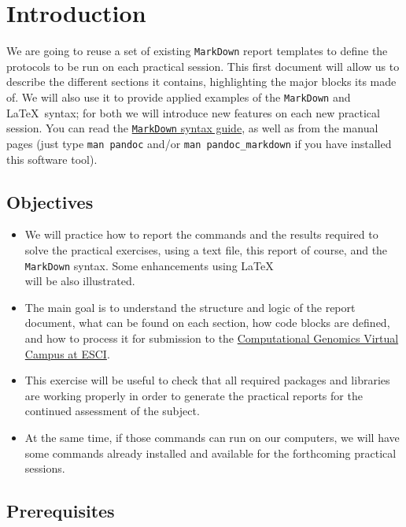 \documentclass[10pt,a4paper,]{article}
\providecommand{\tightlist}{%
  \setlength{\itemsep}{0pt}\setlength{\parskip}{0pt}}
\begin{document}
\hypertarget{introduction}{%
\section{Introduction}\label{introduction}}

We are going to reuse a set of existing \texttt{MarkDown} report
templates to define the protocols to be run on each practical session.
This first document will allow us to describe the different sections it
contains, highlighting the major blocks its made of. We will also use it
to provide applied examples of the \texttt{MarkDown} and \LaTeX~syntax;
for both we will introduce new features on each new practical session.
You can read the
\href{http://daringfireball.net/projects/markdown/syntax\#link}{\texttt{MarkDown}
syntax guide}, as well as from the manual pages (just type
\texttt{man\ pandoc} and/or \texttt{man\ pandoc\_markdown} if you have
installed this software tool).

\hypertarget{objectives}{%
\subsection{Objectives}\label{objectives}}

\begin{itemize}
\tightlist
\item
  We will practice how to report the commands and the results required
  to solve the practical exercises, using a text file, this report of
  course, and the \texttt{MarkDown} syntax. Some enhancements using
  \LaTeX\\
  will be also illustrated.
\item
  The main goal is to understand the structure and logic of the report
  document, what can be found on each section, how code blocks are
  defined, and how to process it for submission to the
  \href{https://aula.esci.upf.edu/course/view.php?id=8516}{Computational Genomics Virtual Campus at ESCI}.
\item
  This exercise will be useful to check that all required packages and
  libraries are working properly in order to generate the practical
  reports for the continued assessment of the subject.
\item
  At the same time, if those commands can run on our computers, we will
  have some commands already installed and available for the forthcoming
  practical sessions.
\end{itemize}

\hypertarget{prerequisites}{%
\subsection{Prerequisites}\label{prerequisites}}
\end{document}

